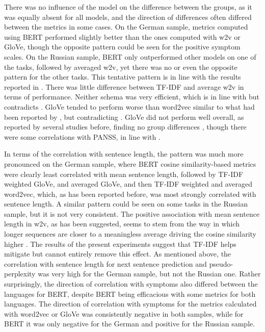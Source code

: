 There was no influence of the model on the difference between the groups, as it was equally absent for all models, and the direction of differences often differed between the metrics in some cases. On the German sample, metrics computed using BERT performed slightly better than the ones computed with w2v or GloVe, though the opposite pattern could be seen for the positive symptom scales. On the Russian sample, BERT only outperformed other models on one of the tasks, followed by averaged w2v, yet there was no or even the opposite pattern for the other tasks. This tentative pattern is in line with the results reported in \citet{ryazanskaya2020thesis}. There was little difference between TF-IDF and average w2v in terms of performance. Neither schema was very efficient, which is in line with \citet{just2020modeling, hitczenko2021understanding} but contradicts \citet{just2019coherence, xu2022fully}. GloVe tended to perform worse than word2vec similar to what had been reported by \citet{iter2018automatic, just2023validation}, but contradicting \citet{just2019coherence}. GloVe did not perform well overall, as reported by several studies before, finding no group differences \citep{just2020modeling, alonso2022language, alonso2022progressive}, though there were some correlations with PANSS, in line with \citet{alonso2022progressive}.

In terms of the correlation with sentence length, the pattern was much more pronounced on the German sample, where BERT cosine similarity-based metrics were clearly least correlated with mean sentence length, followed by TF-IDF weighted GloVe, and averaged GloVe, and then TF-IDF weighted and averaged word2vec, which, as has been reported before, was most strongly correlated with sentence length. A similar pattern could be seen on some tasks in the Russian sample, but it is not very consistent. The positive association with mean sentence length in w2v, as has been suggested, seems to stem from the way in which longer sequences are closer to a meaningless average driving the cosine similarity higher \citep{hitczenko2021understanding, parola2022speech, fradkin2023theory}. The results of the present experiments suggest that TF-IDF helps mitigate but cannot entirely remove this effect. As mentioned above, the correlation with sentence length for next sentence prediction and pseudo-perplexity was very high for the German sample, but not the Russian one. Rather surprisingly, the direction of correlation with symptoms also differed between the languages for BERT, despite BERT being efficacious with some metrics for both languages. The direction of correlation with symptoms for the metrics calculated with word2vec or GloVe was consistently negative in both samples, while for BERT it was only negative for the German and positive for the Russian sample.  

